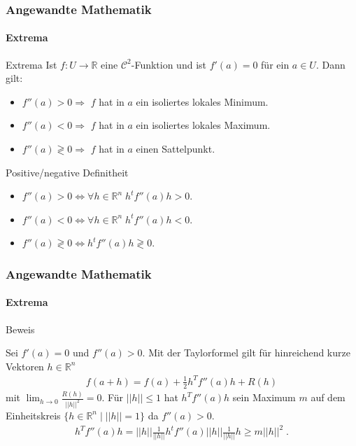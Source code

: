 \documentclass{beamer}
\begin{document}
\begin{frame}
    \frametitle{Angewandte Mathematik}
\framesubtitle{Extrema}
    \begin{block}{Extrema}
 Ist $f: U  \to \mathbb{R}$ eine $\mathcal{C}^2$-Funktion und ist $f'(a) = 0$ für ein $a \in U$. Dann gilt:
\begin{itemize}
\item $f''(a) > 0 \Rightarrow $ $f$ hat in $a$ ein isoliertes lokales Minimum.
\item $f''(a) < 0 \Rightarrow $ $f$ hat in $a$ ein isoliertes lokales Maximum.
\item $f''(a) \gtrless 0 \Rightarrow $ $f$ hat in $a$ einen Sattelpunkt.
\end{itemize} 
\end{block}

\begin{block}{Positive/negative Definitheit}
   \begin{itemize}
   \item $f''(a) > 0 \Leftrightarrow \forall h \in \mathbb{R}^n \; h^t f''(a) h > 0$.
   \item $f''(a) < 0 \Leftrightarrow \forall h \in \mathbb{R}^n \; h^t f''(a) h < 0$.
   \item $f''(a) \gtrless 0 \Leftrightarrow h^t f''(a) h \gtrless 0$.
   \end{itemize} 
   \end{block}

 \end{frame}


\begin{frame}
    \frametitle{Angewandte Mathematik}
\framesubtitle{Extrema}
    \begin{block}{Beweis}

Sei $f'(a) = 0$ und $f''(a) > 0$. Mit der Taylorformel gilt für hinreichend kurze Vektoren $h \in \mathbb{R}^n$
\begin{align*}
f(a + h) = f(a) + \frac{1}{2} h^T f''(a) h + R(h)
\end{align*}
mit $\lim_{h \to 0} \frac{R(h)}{ ||h||^2} = 0$. Für $||h|| \leq 1$ hat $ h^T f''(a) h $ sein Maximum $m$ auf dem Einheitskreis $\{ h \in \mathbb{R}^n \; | \; ||h|| = 1 \}$ da $f''(a) > 0$.
\begin{align*}
 h^T f''(a) h  = ||h|| \frac{1}{||h||} h^t  f''(a)  ||h|| \frac{1}{||h||} h \geq m ||h||^2 \;.
\end{align*}
\end{block}
 \end{frame}
\end{document}

